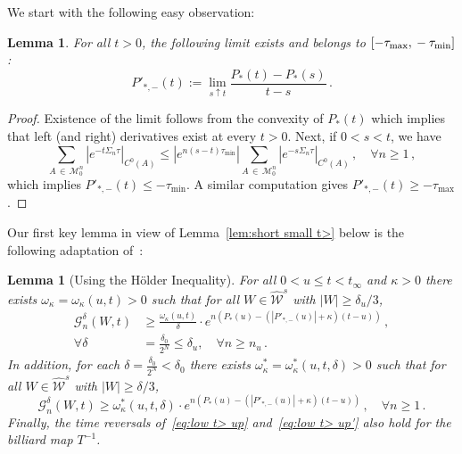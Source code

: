 \documentclass[10pt]{amsart}
\newtheorem{lemm}[theo]{Lemma}\newtheorem{prop}[theo]{Proposition}\newtheorem{coro}[theo]{Corollary}\newtheorem{conj}[theo]{Conjecture}
\theoremstyle{definition}\newtheorem{defi}[theo]{Definition}\newtheorem{rema}[theo]{Remark}\newtheorem{exam}[theo]{Example}\newtheorem{exem}[theo]{Example}\newtheorem{nota}[theo]{Notation}
\newcommand{\cG}{\mathcal{G}}
\newcommand{\MM}{\mathcal{M}}
\newcommand{\cW}{\mathcal{W}}
\newcommand{\hW}{\widehat{\cW}}
\let\oldforall\forall
\renewcommand*{\forall}{\mathrel{\oldforall}}
\begin{document}
We start with the following easy observation:

\begin{lemm}\label{derP}
For all $t>0$,
the following limit exists and belongs to $ [-\tau_{\max},\newline-\tau_{\min}]$:
\[
P'_{*,-}(t):= \lim_{s \uparrow t} \frac{P_*(t)-P_*(s)}{t-s}\,.
\]
\end{lemm}

\begin{proof}
Existence of the limit follows from the convexity of $P_*(t)$
which implies that left (and right) derivatives exist at every $t>0$. Next, if $0<s<t$, we have
\begin{equation}\label{forconv}
\sum_{A\,\in\,\MM_0^n} \left|e^{-t\Sigma_n \tau}\right|_{C^0(A)}\le |e^{n(s-t)\tau_{\min}}|
\sum_{A\,\in\,\MM_0^n} \left|e^{-s\Sigma_n \tau}\right|_{C^0(A)}\,,\quad
\forall n \ge 1\,,
\end{equation}
which implies $P'_{*,-}(t)\le -\tau_{\min}$. A similar computation gives $P'_{*,-}(t)\ge -\tau_{\max}$.
\end{proof}



Our first key lemma in view of Lemma~\ref{lem:short small t>} below is the following adaptation of~\cite[Lemma~3.10]{BD2}:



\begin{lemm}[{Using the H\"older Inequality}]\label{lem:low t>}
For all $0<u \le t< t_\infty$ and $\kappa>0$ there exists $\omega_\kappa =\omega_\kappa(u,t)>0$ such that for all $W \in \hW^s$ with $|W| \ge {\delta_{u}}/3$,
\begin{equation}\label{eq:low t> up}
\begin{split}
\cG_n^\delta(W,t)
&\ge \frac {\omega_\kappa(u,t)} \delta \cdot e^{n\left(P_*(u)-\left(\left| P'_{*,-}(u)\right| + \kappa\right)(t-u)\right)} \,, \\
\forall \delta &=\frac{\delta_0 }{2^{N}} \le \delta_{u}, \quad \forall n\ge n_{u}\,.
\end{split}
\end{equation}
In addition, for each $\delta =\frac{\delta_0}{ 2^N}<\delta_0$ there exists $\omega_\kappa^* =\omega_\kappa^*(u,t,\delta)>0$ such that for all $W \in \hW^s$ with $|W| \ge \delta/3$,
\begin{equation}\label{eq:low t> up'}
\cG_n^\delta(W,t)
\ge \omega_\kappa^*(u,t, \delta) \cdot e^{n\left(P_*(u)-\left(\left| P'_{*,-}(u)\right| + \kappa\right)(t-u)\right)} \,,\quad \forall n\ge 1 \,.
\end{equation}
Finally, the time reversals of~\eqref{eq:low t> up} and~\eqref{eq:low t> up'} also hold for the billiard map $T^{-1}$.
\end{lemm}
\end{document}
